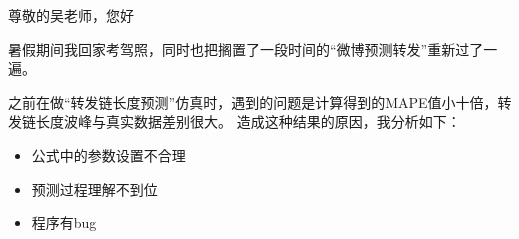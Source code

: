 \documentclass[UTF8]{ctexart}
\begin{document}
\par 尊敬的吴老师，您好
\newline
\par 暑假期间我回家考驾照，同时也把搁置了一段时间的“微博预测转发”重新过了一遍。
\par 之前在做“转发链长度预测”仿真时，遇到的问题是计算得到的MAPE值小十倍，转发链长度波峰与真实数据差别很大。
造成这种结果的原因，我分析如下：
\begin{itemize}
\item 公式中的参数设置不合理
\item 预测过程理解不到位
\item 程序有bug
\end{itemize}
\end{document}
